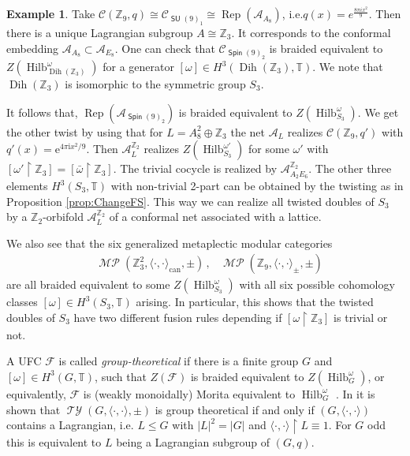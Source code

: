 \documentclass[twoside,11pt,reqno]{amsart}
\makeatletter
\theoremstyle{definition}
\newtheorem{example}[thm]{Example}
\theoremstyle{remark}
\newcommand{\Spin}{\mathop{\mathsf{Spin}}}
\newcommand{\SU}{\mathop{\mathsf{SU}}}
\newcommand{\cF}{\mathcal{F}}
\newcommand{\cC}{\mathcal{C}}
\newcommand{\A}{\mathcal{A}}
\newcommand{\TT}{\mathbb{T}}
\newcommand{\ZZ}{\mathbb{Z}}
\DeclareMathOperator{\Rep}{Rep}
\newcommand{\e}{\mathrm{e}}
\newcommand{\ima}{\mathrm{i}}
\DeclareRobustCommand{\ie}{i.e.\@\xspace}
\DeclareMathOperator{\Dih}{Dih}
\DeclareMathOperator*{\TY}{\mathcal{TY}}
\DeclareMathOperator*{\MP}{\mathcal{MP}}
\DeclareMathOperator{\Vect}{Hilb}
\newcommand{\umtc}[1]{\cC_{#1}}
\newcommand{\bi}[2]{\langle #1,#2\rangle}
\newcommand{\bislotslot}{\bi\cdot\cdot}
\newcommand{\myemph}[1]{\emph{#1}}
\makeatother
\begin{document}
\begin{example}
  Take $\cC(\ZZ_9,q)\cong \umtc{\SU(9)_1}\cong\Rep(\A_{A_8})$, 
  \ie $q(x)=e^{\frac{8\pi i x^2}{9}}$. 
  Then there is a unique Lagrangian subgroup $A\cong \ZZ_3$. 
  It corresponds to the conformal embedding $\A_{A_8}\subset \A_{E_8}$. 
  One can check that $\umtc{\Spin(9)_2}$ is braided equivalent to 
  $Z(\Vect_{\Dih(\ZZ_3)}^\omega)$ for a generator
  $[\omega]\in H^3(\Dih(\ZZ_3),\TT)$. 
  We note that $\Dih(\ZZ_3)$ is isomorphic to the symmetric group $S_3$. 

  It follows that, $\Rep(\A_{\Spin(9)_2})$ is braided equivalent to 
  $Z(\Vect^\omega_{S_3})$. 
  We get the other twist by using that for $L=A_8^2\oplus \ZZ_3$
  the net $\A_L$ realizes $\cC(\ZZ_9,q')$ with $q'(x)=\e^{4\pi \ima x^2/9}$.
  Then $\A_L^{\ZZ_2}$ realizes $Z(\Vect^{\omega'}_{S_3})$
  for some $\omega'$ with 
  $[\omega'\restriction \ZZ_3]=[\bar\omega\restriction\ZZ_3]$.
  The trivial cocycle is realized by $\A^{\ZZ_2}_{A_2E_6}$.
  The other three elements $H^3(S_3,\TT)$ with non-trivial 2-part can be 
  obtained by the twisting as in Proposition \ref{prop:ChangeFS}.
  This way we can realize all twisted doubles of $S_3$ by a 
  $\ZZ_2$-orbifold $\A^{\ZZ_2}_L$ of a conformal net associated with a lattice.

  We also see that the six generalized metaplectic modular categories 
  \begin{align}
    &\MP(\ZZ_3^2,\bislotslot_\mathrm{can},\pm)\,,& 
    \MP(\ZZ_9,\bislotslot_\pm,\pm)
  \end{align}
  are all braided equivalent to some $Z(\Vect_{S_3}^\omega)$ 
  with all six possible cohomology classes $[\omega]\in H^3(S_3,\TT)$ arising.
  In particular, this shows that the twisted doubles of $S_3$ have 
  two different fusion rules depending 
  if $[\omega\restriction\ZZ_3]$ is trivial or not.
\end{example}

A UFC $\cF$ is called \myemph{group-theoretical} if
there is a finite group $G$ and $[\omega]\in H^3(G,\TT)$, such that
$Z(\cF)$ is braided equivalent to $Z(\Vect_G^\omega)$,
or equivalently,  $\cF$ is (weakly monoidally) 
Morita equivalent to $\Vect_G^\omega$ \cite{Mg2003,Mg2003II}.
In \cite[Theorem 4.6]{GeNaNi2009} it is shown that $\TY(G,\bislotslot,\pm)$ 
is group theoretical if and only if $(G,\bislotslot)$ contains a Lagrangian, \ie 
$L\leq G$ with $|L|^2=|G|$ and $\bislotslot\restriction L \equiv 1$. 
For $G$ odd this is equivalent to $L$ being a Lagrangian subgroup of $(G,q)$.
\end{document}
